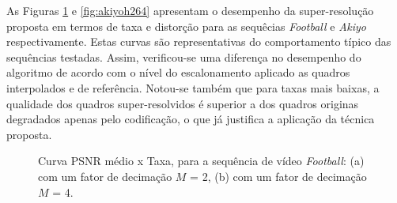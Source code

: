 As Figuras \ref{fig:footballh264} e \ref{fig:akiyoh264} apresentam o desempenho da super-resolução proposta em termos de taxa e distorção para as sequêcias \textit{Football} e \textit{Akiyo} respectivamente. Estas curvas são representativas do comportamento típico das sequências testadas. Assim, verificou-se uma diferença no desempenho do algoritmo de acordo com o nível do escalonamento aplicado as quadros interpolados e de referência. Notou-se também que para taxas mais baixas, a qualidade dos quadros super-resolvidos é superior a dos quadros originas degradados apenas pelo codificação, o que já justifica a aplicação da técnica proposta.


\begin{figure}[H]
	\centering
	\caption{Curva PSNR médio x Taxa, para a sequência de vídeo \textit{Football}: (a) com um fator de decimação $M$ = 2, (b) com um fator de decimação $M$ = 4.}
	\label{fig:footballh264}
\end{figure}


